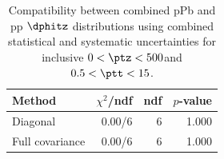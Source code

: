 \begin{table}[htp!]
\centering
\begin{tabular}{|l|r|r|r|}
\hline
Method & $\chi^2$/ndf & ndf & $p$-value \\
\hline
Diagonal & 0.00/6 & 6 & 1.000 \\
Full covariance & 0.00/6 & 6 & 1.000 \\
\hline
\end{tabular}
\caption{Compatibility between combined pPb and pp $\dphitz$ distributions using combined statistical and systematic uncertainties for inclusive $0 < \ptz < 500$\GeV and $0.5 < \ptt < 15$\GeV.}
\label{table:chisq_dphi}
\end{table}
